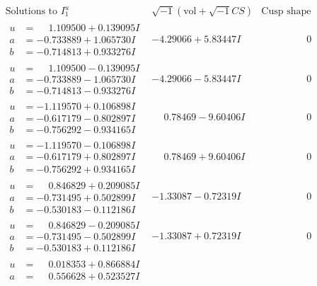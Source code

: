 \documentclass[1p]{elsarticle_modified}
\theoremstyle{definition}
\newcommand{\I}{\sqrt{-1}}
\begin{document}
$$\begin{array}{c|c|c}
\text{Solutions to }I^u_{1}& \I (\text{vol} + \sqrt{-1}CS) & \text{Cusp shape}\\
 \hline 
\begin{aligned}
u &= \phantom{-}1.109500 + 0.139095 I \\
a &= -0.733889 + 1.065730 I \\
b &= -0.714813 + 0.933276 I\end{aligned}
 & -4.29066 + 5.83447 I & \phantom{-0.000000 } 0 \\ \hline\begin{aligned}
u &= \phantom{-}1.109500 - 0.139095 I \\
a &= -0.733889 - 1.065730 I \\
b &= -0.714813 - 0.933276 I\end{aligned}
 & -4.29066 - 5.83447 I & \phantom{-0.000000 } 0 \\ \hline\begin{aligned}
u &= -1.119570 + 0.106898 I \\
a &= -0.617179 - 0.802897 I \\
b &= -0.756292 - 0.934165 I\end{aligned}
 & \phantom{-}0.78469 - 9.60406 I & \phantom{-0.000000 } 0 \\ \hline\begin{aligned}
u &= -1.119570 - 0.106898 I \\
a &= -0.617179 + 0.802897 I \\
b &= -0.756292 + 0.934165 I\end{aligned}
 & \phantom{-}0.78469 + 9.60406 I & \phantom{-0.000000 } 0 \\ \hline\begin{aligned}
u &= \phantom{-}0.846829 + 0.209085 I \\
a &= -0.731495 + 0.502899 I \\
b &= -0.530183 - 0.112186 I\end{aligned}
 & -1.33087 - 0.72319 I & \phantom{-0.000000 } 0 \\ \hline\begin{aligned}
u &= \phantom{-}0.846829 - 0.209085 I \\
a &= -0.731495 - 0.502899 I \\
b &= -0.530183 + 0.112186 I\end{aligned}
 & -1.33087 + 0.72319 I & \phantom{-0.000000 } 0 \\ \hline\begin{aligned}
u &= \phantom{-}0.018353 + 0.866884 I \\
a &= \phantom{-}0.556628 + 0.523527 I \\

\end{aligned}
\end{array}$$
\end{document}
